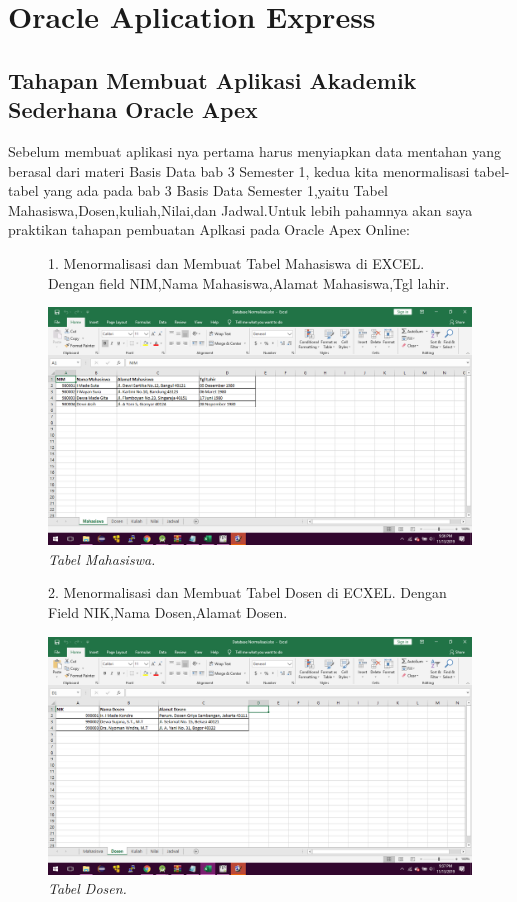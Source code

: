 \chapter{Oracle Aplication Express}

\section{Tahapan Membuat Aplikasi Akademik Sederhana Oracle Apex}
Sebelum membuat aplikasi nya pertama harus menyiapkan data mentahan yang berasal dari materi Basis Data bab 3 Semester 1, kedua kita menormalisasi tabel-tabel yang ada pada bab 3 Basis Data Semester 1,yaitu Tabel Mahasiswa,Dosen,kuliah,Nilai,dan Jadwal.Untuk lebih pahamnya akan saya praktikan tahapan pembuatan Aplkasi pada Oracle Apex Online:  
\begin{enumerate}

\begin{figure}
\item[1.]Menormalisasi dan Membuat Tabel Mahasiswa di EXCEL. Dengan field NIM,Nama Mahasiswa,Alamat Mahasiswa,Tgl lahir.
    \begin{center}
    \includegraphics[scale=0.3]{figures/mhs.png}
    \caption{\textit{Tabel Mahasiswa.}}
    \end{center}   
    \end{figure}

\begin{figure}
\item[2.]Menormalisasi dan Membuat Tabel Dosen di ECXEL. Dengan Field NIK,Nama Dosen,Alamat Dosen.
    \begin{center}
    \includegraphics[scale=0.3]{figures/dosen.png}
    \caption{\textit{Tabel Dosen.}}
    \end{center}
    \label{gambar}
    \end{figure}


\end{enumerate}
